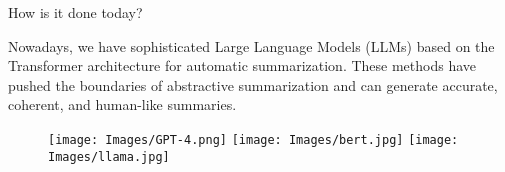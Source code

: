 		\begin{frame}{How is it done today?}

			Nowadays, we have sophisticated Large Language Models (LLMs) based on the
			Transformer architecture \citep{vaswani2017attention} for automatic summarization.
			These methods have pushed the boundaries of abstractive summarization and can
			generate accurate, coherent, and human-like summaries.

			\vskip 1.3cm

			\begin{figure}
				\centering
				\texttt{[image: Images/GPT-4.png]}
				\hfill
				\texttt{[image: Images/bert.jpg]}
				\hfill
				\texttt{[image: Images/llama.jpg]}
			\end{figure}

		\end{frame}
